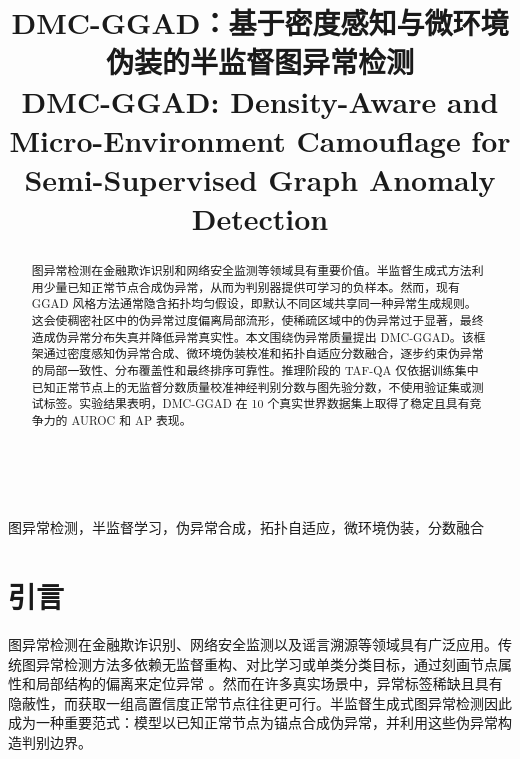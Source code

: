 ﻿﻿﻿﻿    \documentclass[conference, onecolumn]{IEEEtran}
\begin{document}
\renewcommand{\thesection}{\Roman{section}}

    \title{DMC-GGAD：基于密度感知与微环境伪装的半监督图异常检测\\
    DMC-GGAD: Density-Aware and Micro-Environment Camouflage for Semi-Supervised Graph Anomaly Detection\\
    }
    \author{
    }

    \maketitle

    \begin{abstract}
    图异常检测在金融欺诈识别和网络安全监测等领域具有重要价值。半监督生成式方法利用少量已知正常节点合成伪异常，从而为判别器提供可学习的负样本。然而，现有 GGAD 风格方法通常隐含拓扑均匀假设，即默认不同区域共享同一种异常生成规则。这会使稠密社区中的伪异常过度偏离局部流形，使稀疏区域中的伪异常过于显著，最终造成伪异常分布失真并降低异常真实性。本文围绕伪异常质量提出 DMC-GGAD。该框架通过密度感知伪异常合成、微环境伪装校准和拓扑自适应分数融合，逐步约束伪异常的局部一致性、分布覆盖性和最终排序可靠性。推理阶段的 TAF-QA 仅依据训练集中已知正常节点上的无监督分数质量校准神经判别分数与图先验分数，不使用验证集或测试标签。实验结果表明，DMC-GGAD 在 10 个真实世界数据集上取得了稳定且具有竞争力的 AUROC 和 AP 表现。
    \end{abstract}

    \begin{IEEEkeywords}
    图异常检测，半监督学习，伪异常合成，拓扑自适应，微环境伪装，分数融合
    \end{IEEEkeywords}

    \section{引言}
    图异常检测在金融欺诈识别、网络安全监测以及谣言溯源等领域具有广泛应用。传统图异常检测方法多依赖无监督重构、对比学习或单类分类目标，通过刻画节点属性和局部结构的偏离来定位异常 \cite{ref_ma2021, ref_tang2023}。然而在许多真实场景中，异常标签稀缺且具有隐蔽性，而获取一组高置信度正常节点往往更可行。半监督生成式图异常检测因此成为一种重要范式：模型以已知正常节点为锚点合成伪异常，并利用这些伪异常构造判别边界。
\end{document}
